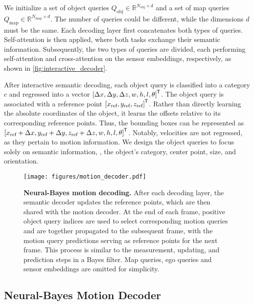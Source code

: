 We initialize a set of object queries $Q_{\text{obj}} \in \mathbb{R}^{N_{\text{obj}} \times d}$ and a set of map queries $Q_{\text{map}} \in \mathbb{R}^{N_{\text{map}} \times d}$. The number of queries could be different, while the dimensions $d$ must be the same. Each decoding layer first concatenates both types of queries. Self-attention \cite{vaswani2017attention} is then applied, where both tasks exchange their semantic information. Subsequently, the two types of queries are divided, each performing self-attention and cross-attention on the sensor embeddings, respectively, as shown in \cref{fig:interactive_decoder}. 

After interactive semantic decoding, each object query is classified into a category $c$ and regressed into a vector ${[\Delta x, \Delta y, \Delta z, w, h, l, \theta]}^{{\mkern-1.0mu}\mathsf{T}}$. The object query is associated with a reference point ${[x_{\text{ref}}, y_{\text{ref}}, z_{\text{ref}}]}^{{\mkern-1.0mu}\mathsf{T}}$. Rather than directly learning the absolute coordinates of the object, it learns the offsets relative to its corresponding reference points. Thus, the bounding boxes can be represented as ${[x_{\text{ref}} + \Delta x, y_{\text{ref}} + \Delta y, z_{\text{ref}} + \Delta z, w, h, l, \theta]}^{{\mkern-1.0mu}\mathsf{T}}$. Notably, velocities are not regressed, as they pertain to motion information. We design the object queries to focus solely on semantic information, \ie, the object’s category, center point, size, and orientation. 


\begin{figure}[t]
    \centering
    \texttt{[image: figures/motion\_decoder.pdf]}
    \caption{\textbf{Neural-Bayes motion decoding.} After each decoding layer, the semantic decoder updates the reference points, which are then shared with the motion decoder. At the end of each frame, positive object query indices are used to select corresponding motion queries and are together propagated to the subsequent frame, with the motion query predictions serving as reference points for the next frame. This process is similar to the measurement, updating, and prediction steps in a Bayes filter.
    Map queries, ego queries and sensor embeddings are omitted for simplicity.}
    \label{fig:motion_decoder}
\end{figure}

\subsection{Neural-Bayes Motion Decoder}
\label{sec:neural-bayes_motion_decoder}


